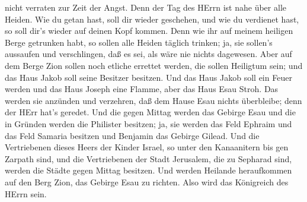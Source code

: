 nicht verraten zur Zeit der Angst.  Denn der Tag des HErrn
ist nahe über alle Heiden. Wie du getan hast, soll dir wieder geschehen,
und wie du verdienet hast, so soll dir's wieder auf deinen Kopf kommen.
 Denn wie ihr auf meinem heiligen Berge getrunken habt, so
sollen alle Heiden täglich trinken; ja, sie sollen's aussaufen und
verschlingen, daß es sei, als wäre nie nichts dagewesen. 
Aber auf dem Berge Zion sollen noch etliche errettet werden, die sollen
Heiligtum sein; und das Haus Jakob soll seine Besitzer besitzen.
 Und das Haus Jakob soll ein Feuer werden und das Haus
Joseph eine Flamme, aber das Haus Esau Stroh. Das werden sie anzünden
und verzehren, daß dem Hause Esau nichts überbleibe; denn der HErr hat's
geredet.  Und die gegen Mittag werden das Gebirge Esau und
die in Gründen werden die Philister besitzen; ja, sie werden das Feld
Ephraim und das Feld Samaria besitzen und Benjamin das Gebirge Gilead.
 Und die Vertriebenen dieses Heers der Kinder Israel, so
unter den Kanaanitern bis gen Zarpath sind, und die Vertriebenen der
Stadt Jerusalem, die zu Sepharad sind, werden die Städte gegen Mittag
besitzen.  Und werden Heilande heraufkommen auf den Berg
Zion, das Gebirge Esau zu richten. Also wird das Königreich des HErrn
sein.
